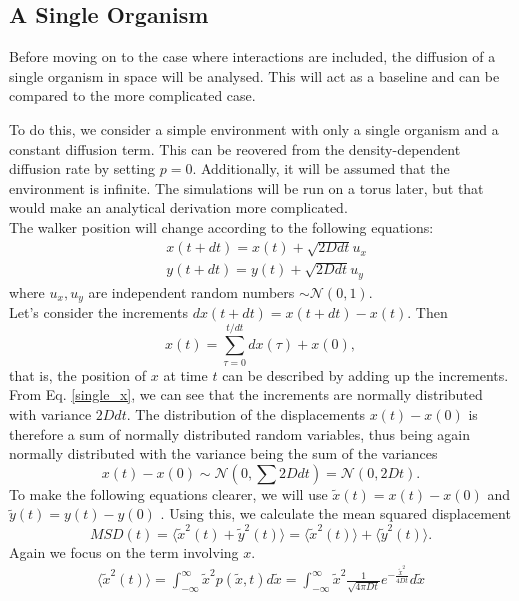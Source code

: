 \documentclass{article}
\begin{document}
\subsection{A Single Organism}
Before moving on to the case where interactions are included, the diffusion of a single organism in space will be analysed.
This will act as a baseline and can be compared to the more complicated case.

To do this, we consider a simple environment with only a single organism and a constant diffusion term. 
This can be reovered from the density-dependent diffusion rate by setting $p=0$.
Additionally, it will be assumed that the environment is infinite. 
The simulations will be run on a torus later, but that would make an analytical derivation more complicated.\\
The walker position will change according to the following equations:
\begin{align}
    & x(t + dt) = x(t) + \sqrt{2D dt} u_x \label{single_x}\\
    & y(t + dt) = y(t) + \sqrt{2D dt} u_y
\end{align}
where $u_x, u_y$ are independent random numbers $\sim \mathcal{N}(0,1)$.\\
Let's consider the increments $dx(t+dt) = x(t + dt) - x(t)$.
Then 
\begin{equation*}
    x(t) = \sum_{\tau = 0}^{t/dt} dx(\tau) + x(0),
\end{equation*}
that is, the position of $x$ at time $t$ can be described by adding up the increments.
From Eq. \ref{single_x}, we can see that the increments are normally distributed with variance $2D dt$.
The distribution of the displacements $x(t) - x(0)$ is therefore a sum of normally distributed random variables, thus being again normally distributed with the variance being the sum of the variances 
\begin{equation*}
    x(t) - x(0) \sim \mathcal{N}(0,\sum 2D dt) =  \mathcal{N}(0,2Dt).
\end{equation*}
To make the following equations clearer, we will use $\tilde{x}(t) = x(t)-x(0)$ and $\tilde{y}(t) = y(t)-y(0)$ .
Using this, we calculate the mean squared displacement 
\begin{equation*}
    MSD(t) = \langle \tilde{x}^2(t) +\tilde{y}^2(t) \rangle = \langle \tilde{x}^2(t)\rangle + \langle\tilde{y}^2(t) \rangle.
\end{equation*}
Again we focus on the term involving $x$.
\begin{align*}
    \langle \tilde{x}^2(t)\rangle = \int_{-\infty}^{\infty} \tilde{x}^2 p(\tilde{x},t)d\tilde{x} = \int_{-\infty}^{\infty} \tilde{x}^2 \frac{1}{\sqrt{4\pi Dt}} e^{-\frac{\tilde{x}^2}{4Dt}}d\tilde{x}
\end{align*}
\end{document}
